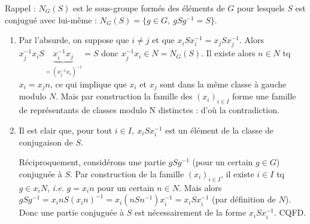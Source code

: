
Rappel : $N_G(S)$ est le sous-groupe formés des éléments de $G$ pour lesquels $S$ est conjugué avec lui-même :  $N_G(S) = \{g\in G,~ gSg^{-1} = S\}$.

\begin{enumerate}
 \item Par l'absurde, on suppose que $i\neq j$ et que $x_iSx_i^{-1} = x_jSx_j^{-1}$. Alors $x_j^{-1}x_iS\underbrace{x_i^{-1}x_j}_{=(x_j^{-1}x_i)^{-1}} = S$ donc $x_j^{-1}x_i \in N = N_G(S)$. Il existe alors $n\in N$ tq $x_i = x_jn$, ce qui implique que $x_i$ et $x_j$ sont dans la même classe à gauche modulo $N$. Mais par construction la famille des $(x_i)_{i\in I}$ forme une famille de représentants de classes modulo N distinctes : d'où la contradiction.

 \item Il est clair que, pour tout $i\in I,~ x_iSx_i^{-1}$ est un élément de la classe de conjugaison de $S$.

 Réciproquement, considérons une partie $gSg^{-1}$ (pour un certain $g \in G$) conjuguée à $S$. Par construction de la famille  $(x_i)_{i\in I}$, il existe $i\in I$ tq $g \in x_iN$, \emph{i.e.} $g = x_i n$ pour un certain $n\in N$. Mais alors $gSg^{-1} = x_i n S (x_i n)^{-1} = x_i \left(n Sn^{-1}\right) x_i^{-1} = x_i S x_i^{-1}$ (par définition de $N$). Donc une partie conjuguée à $S$ est nécessairement de la forme $x_i S x_i^{-1}$. CQFD.
\end{enumerate}
